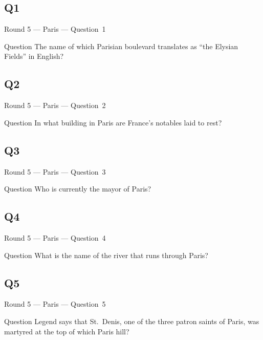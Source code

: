 \documentclass[11pt]{beamer}
\begin{document}
\subsection*{Q1}
\begin{frame}[t]{Round 5 --- Paris --- \mbox{Question 1}}
\vspace{-0.5em}
\begin{block}{Question}
The name of which Parisian boulevard translates as ``the Elysian Fields'' in English?
\end{block}
\end{frame}
\subsection*{Q2}
\begin{frame}[t]{Round 5 --- Paris --- \mbox{Question 2}}
\vspace{-0.5em}
\begin{block}{Question}
In what building in Paris are France's notables laid to rest?
\end{block}
\end{frame}
\subsection*{Q3}
\begin{frame}[t]{Round 5 --- Paris --- \mbox{Question 3}}
\vspace{-0.5em}
\begin{block}{Question}
Who is currently the mayor of Paris?
\end{block}
\end{frame}
\subsection*{Q4}
\begin{frame}[t]{Round 5 --- Paris --- \mbox{Question 4}}
\vspace{-0.5em}
\begin{block}{Question}
What is the name of the river that runs through Paris?
\end{block}
\end{frame}
\subsection*{Q5}
\begin{frame}[t]{Round 5 --- Paris --- \mbox{Question 5}}
\vspace{-0.5em}
\begin{block}{Question}
Legend says that St.\ Denis, one of the three patron saints of Paris, was martyred at the top of which Paris hill?
\end{block}
\end{frame}
\end{document}
